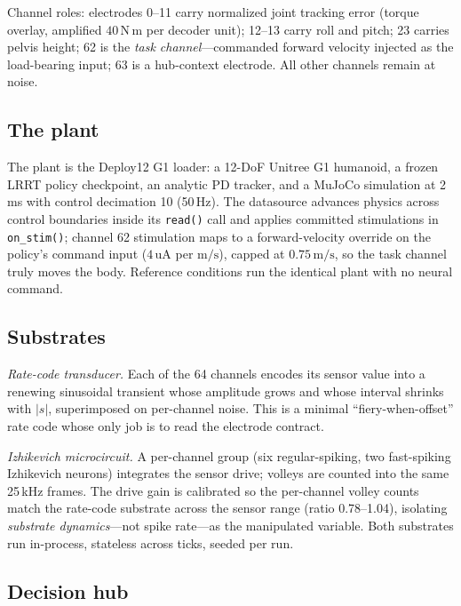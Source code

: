 Channel roles: electrodes 0--11 carry normalized joint tracking error (torque
overlay, amplified $40\,\mathrm{N\,m}$ per decoder unit); 12--13 carry roll and
pitch; 23 carries pelvis height; 62 is the \emph{task channel}---commanded
forward velocity injected as the load-bearing input; 63 is a hub-context
electrode. All other channels remain at noise.

\subsection{The plant}

The plant is the Deploy12 G1 loader: a 12-DoF Unitree G1 humanoid, a frozen
LRRT policy checkpoint, an analytic PD tracker, and a MuJoCo simulation at
2\,ms with control decimation 10 (50\,Hz). The datasource advances physics
across control boundaries inside its \texttt{read()} call and applies
committed stimulations in \texttt{on\_stim()}; channel 62 stimulation maps to a
forward-velocity override on the policy's command input
($4\,\mathrm{uA}$ per $\mathrm{m/s}$), capped at $0.75\,\mathrm{m/s}$, so the
task channel truly moves the body. Reference conditions run the identical
plant with no neural command.

\subsection{Substrates}

\textit{Rate-code transducer.} Each of the 64 channels encodes its sensor value
into a renewing sinusoidal transient whose amplitude grows and whose interval
shrinks with $|s|$, superimposed on per-channel noise. This is a minimal
``fiery-when-offset'' rate code whose only job is to read the electrode
contract.

\textit{Izhikevich microcircuit.} A per-channel group (six regular-spiking,
two fast-spiking Izhikevich neurons) integrates the sensor drive; volleys are
counted into the same 25\,kHz frames. The drive gain is calibrated so the
per-channel volley counts match the rate-code substrate across the sensor
range (ratio 0.78--1.04), isolating \emph{substrate dynamics}---not spike
rate---as the manipulated variable. Both substrates run in-process, stateless
across ticks, seeded per run.

\subsection{Decision hub}

